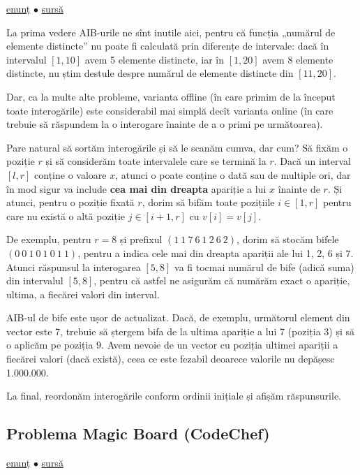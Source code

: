 \href{https://www.spoj.com/problems/DQUERY/}{enunț}
$\bullet$
\hyperref[code:dquery-fenwick]{sursă}

La prima vedere AIB-urile ne sînt inutile aici, pentru că funcția „numărul de elemente distincte” nu poate fi calculată prin diferențe de intervale: dacă în intervalul $[1, 10]$ avem 5 elemente distincte, iar în $[1, 20]$ avem 8 elemente distincte, nu știm destule despre numărul de elemente distincte din $[11, 20]$.

Dar, ca la multe alte probleme, varianta offline (în care primim de la început toate interogările) este considerabil mai simplă decît varianta online (în care trebuie să răspundem la o interogare înainte de a o primi pe următoarea).

Pare natural să sortăm interogările și să le scanăm cumva, dar cum? Să fixăm o poziție $r$ și să considerăm toate intervalele care se termină la $r$. Dacă un interval $[l, r]$ conține o valoare $x$, atunci o poate conține o dată sau de multiple ori, dar în mod sigur va include \textbf{cea mai din dreapta} apariție a lui $x$ înainte de $r$. Și atunci, pentru o poziție fixată $r$, dorim să bifăm toate pozițiile $i \in [1, r]$ pentru care nu există o altă poziție $j \in [i+1, r]$ cu $v[i] = v[j]$.

De exemplu, pentru $r = 8$ și prefixul $(1\ 1\ 7\ 6\ 1\ 2\ 6\ 2)$, dorim să stocăm bifele $(0\ 0\ 1\ 0\ 1\ 0\ 1\ 1)$, pentru a indica cele mai din dreapta apariții ale lui 1, 2, 6 și 7. Atunci răspunsul la interogarea $[5, 8]$ va fi tocmai numărul de bife (adică suma) din intervalul $[5, 8]$, pentru că astfel ne asigurăm că numărăm exact o apariție, ultima, a fiecărei valori din interval.

AIB-ul de bife este ușor de actualizat. Dacă, de exemplu, următorul element din vector este 7, trebuie să ștergem bifa de la ultima apariție a lui 7 (poziția 3) și să o aplicăm pe poziția 9. Avem nevoie de un vector cu poziția ultimei apariții a fiecărei valori (dacă există), ceea ce este fezabil deoarece valorile nu depășesc 1.000.000.

La final, reordonăm interogările conform ordinii inițiale și afișăm răspunsurile.

\subsection{Problema Magic Board (CodeChef)}
\label{problem:mboard}

\href{https://www.codechef.com/problems/MBOARD}{enunț}
$\bullet$
\hyperref[code:mboard]{sursă}

